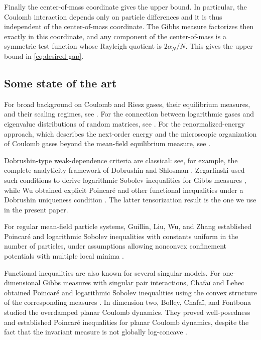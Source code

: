 \documentclass[12pt,reqno,letterpaper]{amsart}
\theoremstyle{definition}
\theoremstyle{remark}
\numberwithin{equation}{section}
\newcommand{\al}{\alpha}
\begin{document}
Finally the center-of-mass coordinate
gives the upper bound. In particular, the Coulomb interaction depends only on particle differences and it is thus  independent of the center-of-mass coordinate. The Gibbs measure factorizes then exactly in this coordinate, and any component of the center-of-mass is a symmetric test function whose Rayleigh quotient is \(2\al_N/N\). This gives the upper bound in \eqref{eq:desired-gap}.


\subsection{Some state of the art}
For broad background on Coulomb and Riesz gases, their equilibrium measures,
and their scaling regimes, see
\cite{Lewin,ChafaiAspects,SerfatyLectures}. For the connection between
logarithmic gases and eigenvalue distributions of random matrices, see \cite{Forrester,AGZ}. 
For the renormalized-energy approach, which describes the next-order energy and the microscopic organization of Coulomb gases beyond the mean-field equilibrium measure, see \cite{SandierSerfaty,SerfatyBook,RougerieSerfaty}.


Dobrushin-type weak-dependence criteria are classical: see, for example,
the complete-analyticity framework of Dobrushin and Shlosman
\cite{DS}. Zegarlinski used such conditions to derive logarithmic Sobolev
inequalities for Gibbs measures \cite{Zegarlinski}, while Wu obtained
explicit Poincar\'e and other functional  inequalities under a Dobrushin
uniqueness condition \cite{Wu}. The latter tensorization result is the one
we use in the present paper.

For regular mean-field particle systems, Guillin, Liu, Wu, and Zhang
established Poincar\'e and logarithmic Sobolev inequalities with constants
uniform in the number of particles, under assumptions allowing
nonconvex confinement potentials with multiple local minima
\cite{GLWZ}. 



Functional inequalities are also known for several singular models.
For one-dimensional Gibbs measures with singular pair interactions, Chafa\"i
and Lehec obtained Poincar\'e and logarithmic Sobolev inequalities using
the convex structure of the corresponding measures
\cite{ChafaiLehec}. In dimension two, Bolley, Chafa\"i, and Fontbona
studied the overdamped planar Coulomb dynamics. They proved
well-posedness and established Poincar\'e inequalities for planar
Coulomb dynamics, despite the fact
that the invariant measure is not globally
log-concave \cite{BCF}. 
\end{document}
